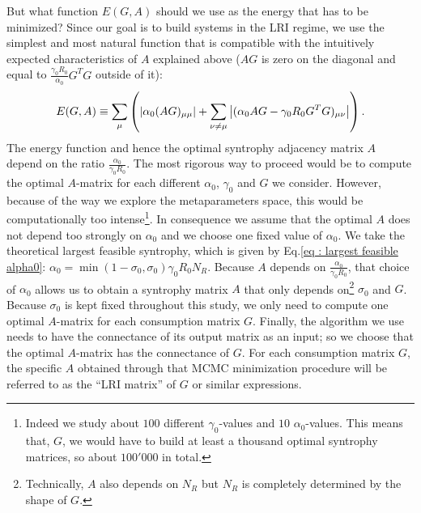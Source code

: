 \documentclass[12pt, titlepage]{report}
\begin{document}
But what function $E(G,A)$ should we use as the energy that has to be minimized? Since our goal is to build systems in the LRI regime, we use the simplest and most natural function that is compatible with the intuitively expected characteristics of $A$ explained above (\ie $AG$ is zero on the diagonal and equal to $\frac{\gamma_0 R_0}{\alpha_0} G^TG$ outside of it):
\begin{equation}
E(G,A) \equiv \sum_\mu \left( \left|{\alpha_0(AG)_{\mu\mu}}\right| + \sum_{\nu\neq\mu} \left|{(\alpha_0 AG-\gamma_0 R_0 G^TG)_{\mu\nu} }\right|\right). \label{eq: dynamical stability methods LRI MC solver energy definition}
\end{equation}
The energy function and hence the optimal syntrophy adjacency matrix $A$ depend on the ratio $\frac{\alpha_0}{\gamma_0 R_0}$. The most rigorous way to proceed would be to compute the optimal $A$-matrix for each different $\alpha_0$, $\gamma_0$ and $G$ we consider. However, because of the way we explore the metaparameters space, this would be computationally too intense\footnote{Indeed we study about $100$ different $\gamma_0$-values and $10$ $\alpha_0$-values. This means that,  $G$, we would have to build at least a thousand optimal syntrophy matrices, so about $100'000$ in total.}. In consequence we assume that the optimal $A$ does not depend too strongly on $\alpha_0$ and we choose one fixed value of $\alpha_0$. We take the theoretical largest feasible syntrophy, which is given by Eq.\eqref{eq : largest feasible alpha0}: $\alpha_0 = \min(1-\sigma_0, \sigma_0) \gamma_0 R_0 N_R$. Because $A$ depends on $\frac{\alpha_0}{\gamma_0 R_0}$, that choice of $\alpha_0$ allows us to obtain a syntrophy matrix $A$ that only depends on\footnote{Technically, $A$ also depends on $N_R$ but $N_R$ is completely determined by the shape of $G$.} $\sigma_0$ and $G$. Because $\sigma_0$ is kept fixed throughout this study, we only need to compute one optimal $A$-matrix for each consumption matrix $G$. Finally, the algorithm we use needs to have the connectance of its output matrix as an input; so we choose that the optimal $A$-matrix has the connectance of $G$. For each consumption matrix $G$, the specific $A$ obtained through that MCMC minimization procedure will be referred to as the ``LRI matrix'' of $G$ or similar expressions.
\end{document}
